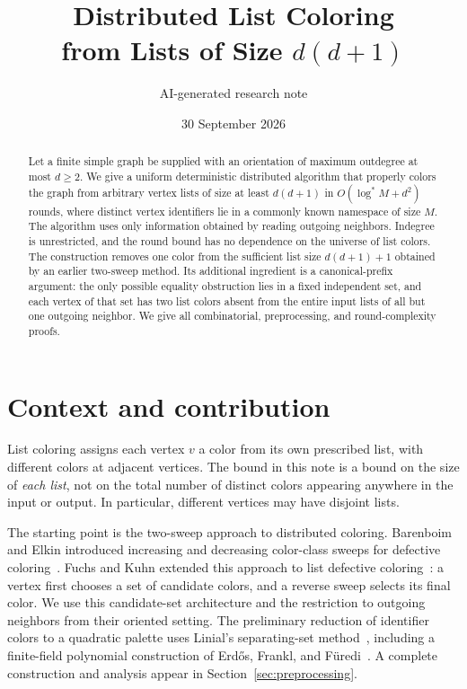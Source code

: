 \documentclass[11pt,a4paper]{article}
\title{Distributed List Coloring\\from Lists of Size
  \texorpdfstring{$d(d+1)$}{d(d+1)}}
\author{AI-generated research note}
\date{30 September 2026}
\numberwithin{equation}{section}
\newcommand{\logstar}{\log^{*}}
\begin{document}
\maketitle

\begin{abstract}
Let a finite simple graph be supplied with an orientation of maximum
outdegree at most \(d\geq 2\). We give a uniform deterministic distributed
algorithm that properly colors the graph from arbitrary vertex lists of
size at least \(d(d+1)\) in \(O(\logstar M+d^2)\) rounds, where distinct
vertex identifiers lie in a commonly known namespace of size \(M\).
The algorithm uses only information obtained by reading outgoing
neighbors. Indegree is unrestricted, and the round bound has no
dependence on the universe of list colors. The construction removes one
color from the sufficient list size \(d(d+1)+1\) obtained by an earlier
two-sweep method. Its additional ingredient is a canonical-prefix
argument: the only possible equality obstruction lies in a fixed
independent set, and each vertex of that set has two list colors absent
from the entire input lists of all but one outgoing neighbor.
We give all combinatorial, preprocessing, and round-complexity proofs.
\end{abstract}

\section{Context and contribution}
\label{sec:context}

List coloring assigns each vertex \(v\) a color from its own prescribed
list, with different colors at adjacent vertices. The bound in this
note is a bound on the size of \emph{each list}, not on the total number
of distinct colors appearing anywhere in the input or output.
In particular, different vertices may have disjoint lists.

The starting point is the two-sweep approach to distributed coloring.
Barenboim and Elkin introduced increasing and decreasing color-class
sweeps for defective coloring~\cite{BE09}. Fuchs and Kuhn extended this
approach to list defective coloring~\cite{FK24,FK26}: a vertex first
chooses a set of candidate colors, and a reverse sweep selects its final
color. We use this candidate-set architecture and the restriction to
outgoing neighbors from their oriented setting. The preliminary
reduction of identifier colors to a quadratic palette uses Linial's
separating-set method~\cite{Linial92}, including a finite-field
polynomial construction of Erd\H{o}s, Frankl, and F\"uredi~\cite{EFF85}.
A complete construction and analysis appear in
Section~\ref{sec:preprocessing}.
\end{document}
